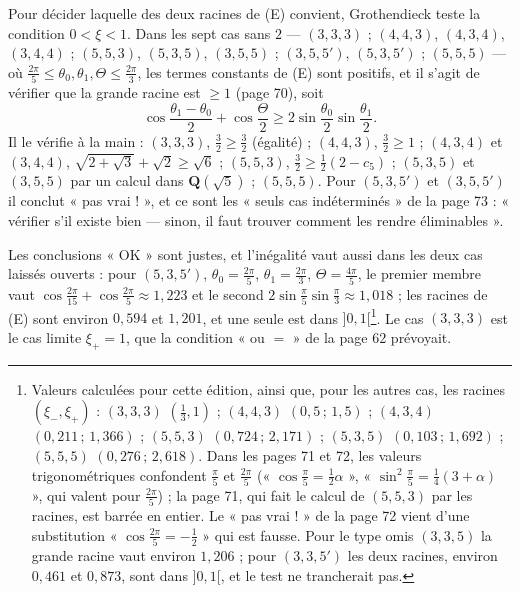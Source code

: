 \documentclass[11pt,a4paper]{article}
\begin{document}
Pour décider laquelle des deux racines de (E) convient, Grothendieck teste la
condition $0 < \xi < 1$. Dans les sept cas sans $2$ --- $(3,3,3)$ ; $(4,4,3)$,
$(4,3,4)$, $(3,4,4)$ ; $(5,5,3)$, $(5,3,5)$, $(3,5,5)$ ; $(3,5,5')$, $(5,3,5')$ ;
$(5,5,5)$ --- où $\frac{2\pi}{5} \leq \theta_0, \theta_1, \Theta \leq
\frac{2\pi}{3}$, les termes constants de (E) sont positifs, et il s'agit de
vérifier que la grande racine est $\geq 1$ (page 70), soit
\[
  \cos\frac{\theta_1 - \theta_0}{2} + \cos\frac\Theta2 \geq 2\sin\frac{\theta_0}{2}
  \sin\frac{\theta_1}{2} .
\]
Il le vérifie à la main : $(3,3,3)$, $\frac32 \geq \frac32$ (égalité) ;
$(4,4,3)$, $\frac32 \geq 1$ ; $(4,3,4)$ et $(3,4,4)$, $\sqrt{2 + \sqrt3} + \sqrt2
\geq \sqrt6$ ; $(5,5,3)$, $\frac32 \geq \frac12(2 - c_5)$ ; $(5,3,5)$ et $(3,5,5)$
par un calcul dans $\mathbf{Q}(\sqrt5)$ ; $(5,5,5)$. Pour $(5,3,5')$ et
$(3,5,5')$ il conclut « pas vrai ! », et ce sont les « seuls cas
indéterminés » de la page 73 : « vérifier s'il existe bien --- sinon, il faut
trouver comment les rendre éliminables ».

Les conclusions « OK » sont justes, et l'inégalité vaut aussi dans les deux
cas laissés ouverts : pour $(5,3,5')$, $\theta_0 = \frac{2\pi}{5}$, $\theta_1 =
\frac{2\pi}{3}$, $\Theta = \frac{4\pi}{5}$, le premier membre vaut $\cos\frac{2\pi}{15}
+ \cos\frac{2\pi}{5} \approx 1{,}223$ et le second $2\sin\frac\pi5\sin\frac\pi3
\approx 1{,}018$ ; les racines de (E) sont environ $0{,}594$ et $1{,}201$, et
une seule est dans $]0, 1[$\footnote{Valeurs calculées pour cette édition, ainsi
que, pour les autres cas, les racines $(\xi_-, \xi_+)$ : $(3,3,3)$ $(\frac13,
1)$ ; $(4,4,3)$ $(0{,}5 \,;\, 1{,}5)$ ; $(4,3,4)$ $(0{,}211 \,;\, 1{,}366)$ ; $(5,5,3)$
$(0{,}724 \,;\, 2{,}171)$ ; $(5,3,5)$ $(0{,}103 \,;\, 1{,}692)$ ; $(5,5,5)$ $(0{,}276 \,;\, 2{,}618)$. Dans les pages 71 et 72, les valeurs trigonométriques confondent
$\frac\pi5$ et $\frac{2\pi}5$ (« $\cos\frac\pi5 = \frac12\alpha$ »,
« $\sin^2\frac\pi5 = \frac14(3 + \alpha)$ », qui valent pour $\frac{2\pi}5$) ;
la page 71, qui fait le calcul de $(5,5,3)$ par les racines, est barrée en
entier. Le « pas vrai ! » de la page 72 vient d'une substitution
« $\cos\frac{2\pi}{5} = -\frac12$ » qui est fausse. Pour le type omis
$(3,3,5)$ la grande racine vaut environ $1{,}206$ ; pour $(3,3,5')$ les deux
racines, environ $0{,}461$ et $0{,}873$, sont dans $]0, 1[$, et le test ne
trancherait pas.}. Le cas $(3,3,3)$ est le cas limite $\xi_+ = 1$, que la
condition « ou $=$ » de la page 62 prévoyait.

\end{document}
